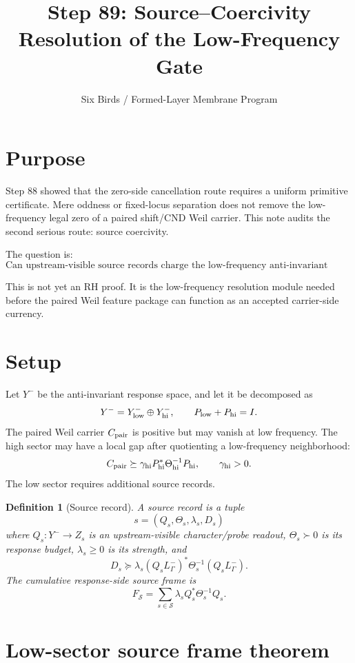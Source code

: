 \documentclass[11pt]{article}
\title{Step 89: Source--Coercivity Resolution of the Low-Frequency Gate}
\author{Six Birds / Formed-Layer Membrane Program}
\date{}
\newtheorem{definition}{Definition}
\begin{document}
\maketitle

\section{Purpose}
Step 88 showed that the zero-side cancellation route requires a uniform primitive certificate. Mere oddness or fixed-locus separation does not remove the low-frequency legal zero of a paired shift/CND Weil carrier. This note audits the second serious route: source coercivity.

The question is:
\[
\text{Can upstream-visible source records charge the low-frequency anti-invariant sector strongly enough?}
\]

This is not yet an RH proof. It is the low-frequency resolution module needed before the paired Weil feature package can function as an accepted carrier-side currency.

\section{Setup}
Let $Y^-$ be the anti-invariant response space, and let it be decomposed as
\[
Y^- = Y^-_{\rm low}\oplus Y^-_{\rm hi},
\qquad
P_{\rm low}+P_{\rm hi}=I.
\]
The paired Weil carrier $C_{\rm pair}$ is positive but may vanish at low frequency. The high sector may have a local gap after quotienting a low-frequency neighborhood:
\[
C_{\rm pair}\succeq \gamma_{\rm hi} P_{\rm hi}^*\Theta_{\rm hi}^{-1}P_{\rm hi},
\qquad \gamma_{\rm hi}>0.
\]
The low sector requires additional source records.

\begin{definition}[Source record]
A source record is a tuple
\[
s=(Q_s,\Theta_s,\lambda_s,D_s)
\]
where $Q_s:Y^-\to Z_s$ is an upstream-visible character/probe readout, $\Theta_s\succ0$ is its response budget, $\lambda_s\ge0$ is its strength, and
\[
D_s\succeq \lambda_s (Q_s L^-_\Gamma)^*\Theta_s^{-1}(Q_s L^-_\Gamma).
\]
The cumulative response-side source frame is
\[
F_{\mathcal S}=\sum_{s\in\mathcal S}\lambda_s Q_s^*\Theta_s^{-1}Q_s.
\]
\end{definition}

\section{Low-sector source frame theorem}
\end{document}

